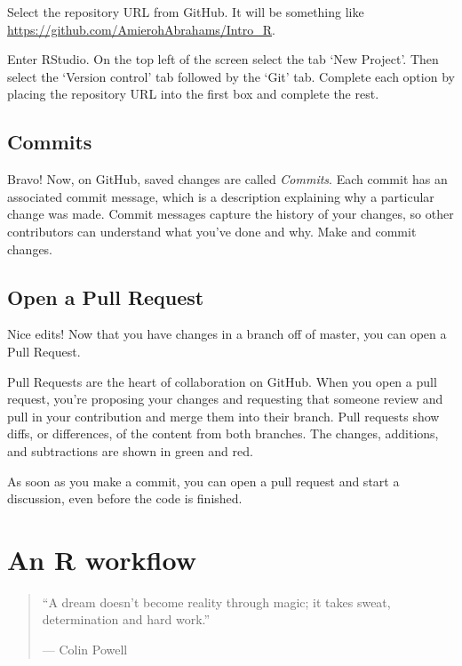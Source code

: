 \documentclass[
]{book}
\begin{document}
Select the repository URL from GitHub. It will be something like \url{https://github.com/AmierohAbrahams/Intro_R}.

Enter RStudio. On the top left of the screen select the tab `New Project'. Then select the `Version control' tab followed by the `Git' tab. Complete each option by placing the repository URL into the first box and complete the rest.

\hypertarget{commits}{%
\section{Commits}\label{commits}}

Bravo! Now, on GitHub, saved changes are called \emph{Commits}. Each commit has an associated commit message, which is a description explaining why a particular change was made. Commit messages capture the history of your changes, so other contributors can understand what you've done and why.
Make and commit changes.

\hypertarget{open-a-pull-request}{%
\section{Open a Pull Request}\label{open-a-pull-request}}

Nice edits! Now that you have changes in a branch off of master, you can open a Pull Request.

Pull Requests are the heart of collaboration on GitHub. When you open a pull request, you're proposing your changes and requesting that someone review and pull in your contribution and merge them into their branch. Pull requests show diffs, or differences, of the content from both branches. The changes, additions, and subtractions are shown in green and red.

As soon as you make a commit, you can open a pull request and start a discussion, even before the code is finished.

\hypertarget{workflow}{%
\chapter{An R workflow}\label{workflow}}

\begin{quote}
``A dream doesn't become reality through magic; it takes sweat, determination and hard work.''

--- Colin Powell
\end{quote}
\end{document}
